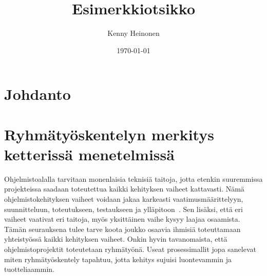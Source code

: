 \documentclass[finnish]{../tktltiki2}
\title{Esimerkkiotsikko}
\author{Kenny Heinonen}
\date{\today}
\theoremstyle{definition}
\theoremstyle{remark}
\begin{document}

\maketitle        %

\tableofcontents  %
\newpage          %



\section{Johdanto}

\section{Ryhmätyöskentelyn merkitys ketterissä menetelmissä}


Ohjelmistoalalla tarvitaan monenlaisia teknisiä taitoja, jotta etenkin suuremmissa projekteissa saadaan toteutettua kaikki kehityksen vaiheet kattavasti. Nämä ohjelmistokehityksen vaiheet voidaan jakaa karkeasti vaatimusmäärittelyyn, suunnitteluun, toteutukseen, testaukseen ja ylläpitoon~\cite{Capretz:2010:MSS:1726559.1726574}. Sen lisäksi, että eri vaiheet vaativat eri taitoja, myös yksittäinen vaihe kysyy laajaa osaamista. Tämän seurauksena tulee tarve koota joukko osaavia ihmisiä toteuttamaan yhteistyössä kaikki kehityksen vaiheet. Onkin hyvin tavanomaista, että ohjelmistoprojektit toteutetaan ryhmätyönä. Useat prosessimallit jopa sanelevat miten ryhmätyöskentely tapahtuu, jotta kehitys sujuisi luontevammin ja tuotteliaammin.\\
\end{document}
